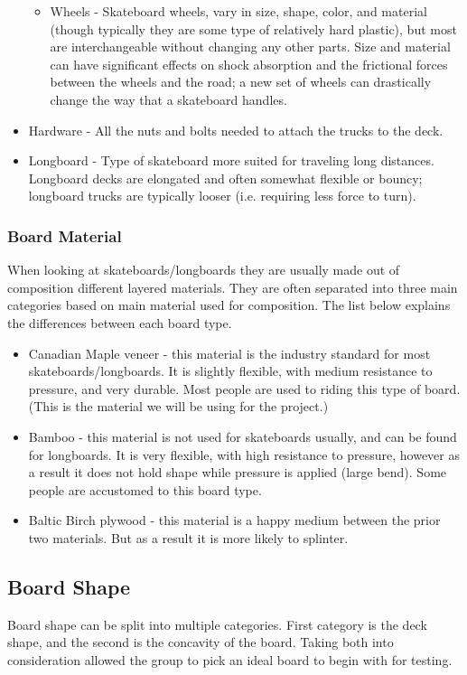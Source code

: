 \documentclass[letterpaper,12pt]{article}
\begin{document}
\begin{itemize}
\begin{itemize}
\item Wheels - Skateboard wheels, vary in size, shape, color, and material (though typically they are some type of relatively hard plastic), but most are interchangeable without changing any other parts. Size and material can have significant effects on shock absorption and the frictional forces between the wheels and the road; a new set of wheels can drastically change the way that a skateboard handles.
\end{itemize}
\item Hardware - All the nuts and bolts needed to attach the trucks to the deck.
\item Longboard - Type of skateboard more suited for traveling long distances. Longboard decks are elongated and often somewhat flexible or bouncy; longboard trucks are typically looser (i.e. requiring less force to turn).
\end{itemize}

\subsubsection{Board Material}
When looking at skateboards/longboards they are usually made out of composition different layered materials. They are often separated into three main categories based on main material used for composition. The list below explains the differences between each board type.
\begin{itemize}
    \item Canadian Maple veneer - this material is the industry standard for most skateboards/longboards. It is slightly flexible, with medium resistance to pressure, and very durable. Most people are used to riding this type of board. (This is the material we will be using for the project.)
    \item Bamboo - this material is not used for skateboards usually, and can be found for longboards. It is very flexible, with high resistance to pressure, however as a result it does not hold shape while pressure is applied (large bend). Some people are accustomed to this board type.
    \item Baltic Birch plywood - this material is a happy medium between the prior two materials. But as a result it is more likely to splinter.
\end{itemize}

\subsection{Board Shape}
Board shape can be split into multiple categories. First category is the deck shape, and the second is the concavity of the board. Taking both into consideration allowed the group to pick an ideal board to begin with for testing.
\end{document}
